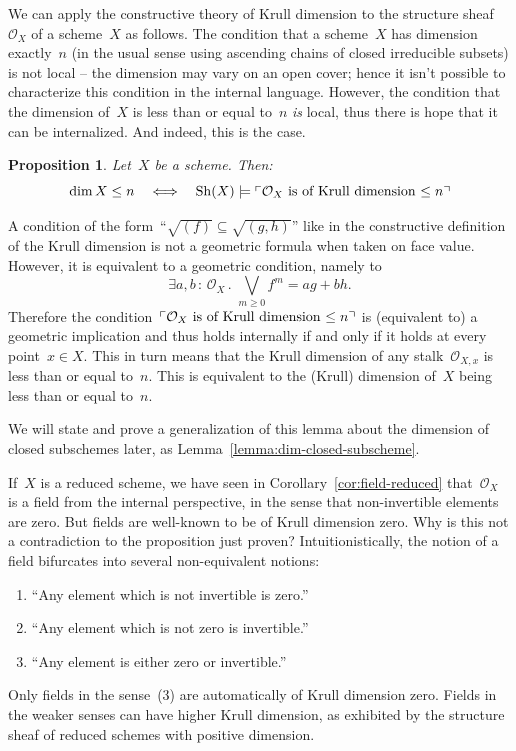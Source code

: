 \documentclass[10pt,reqno,a4paper]{amsbook}
\makeatletter
\theoremstyle{definition}
\theoremstyle{plain}
\newtheorem{prop}[defn]{Proposition}
\theoremstyle{remark}
\renewcommand{\O}{\mathcal{O}}
\newcommand{\Sh}{\mathrm{Sh}}
\newcommand{\?}{\,{:}\,}
\renewcommand{\_}{\mathpunct{.}\,}
\newcommand{\speak}[1]{\ulcorner\text{\textnormal{#1}}\urcorner}
\newcommand{\defeq}{\vcentcolon=}
\renewenvironment{proof}[1][\proofname]{\par
  \pushQED{\qed}%
  \normalfont \topsep6\p@\@plus6\p@\relax
  \trivlist
  \item[\hskip\labelsep
        \itshape
    #1\@addpunct{.}]\ignorespaces
}{%
  \popQED\endtrivlist\@endpefalse
}
\makeatother
\begin{document}
We can apply the constructive theory of Krull dimension to the structure
sheaf~$\O_X$ of a scheme~$X$ as follows. The condition that a
scheme~$X$ has dimension exactly~$n$ (in the usual sense using ascending chains
of closed irreducible subsets) is not local -- the dimension may vary on
an open cover; hence it isn't possible to characterize this condition in
the internal language. However, the condition that the dimension of~$X$ is less
than or equal to~$n$ \emph{is} local, thus there is hope that it can be
internalized. And indeed, this is the case.

\begin{prop}\label{prop:dimension-scheme-ox}
Let~$X$ be a scheme. Then:
\[ \dim X \leq n \quad\Longleftrightarrow\quad
  \Sh(X) \models \speak{$\O_X$ is of Krull dimension~$\leq n$}
  \]
\end{prop}
\begin{proof}

A condition of the form~``$\sqrt{(f)} \subseteq \sqrt{(g,h)}$''
like in the constructive definition of the Krull dimension is not a geometric
formula when taken on face value. However, it is equivalent to a geometric
condition, namely to
\[ \exists a,b\?\O_X\_ \bigvee_{m \geq 0} f^m = ag + bh. \]
Therefore the condition~$\speak{$\O_X$ is of Krull
dimension~$\leq n$}$ is (equivalent to) a geometric implication and thus holds
internally if and only if it holds at every point~$x \in X$. This in turn means that the
Krull dimension of any stalk~$\O_{X,x}$ is less than or equal to~$n$. This is
equivalent to the (Krull) dimension of~$X$ being less than or equal to~$n$.
\end{proof}

We will state and prove a generalization of this lemma about the dimension of closed
subschemes later, as Lemma~\ref{lemma:dim-closed-subscheme}.

If~$X$ is a reduced scheme, we have seen in Corollary~\ref{cor:field-reduced}
that~$\O_X$ is a field from the internal perspective, in the sense that
non-invertible elements are zero. But fields are well-known to be of Krull
dimension zero. Why is this not a contradiction to the proposition just proven?
Intuitionistically, the notion of a field bifurcates into several
non-equivalent notions:
\begin{enumerate}
\item ``Any element which is not invertible is zero.''
\item ``Any element which is not zero is invertible.''
\item ``Any element is either zero or invertible.''
\end{enumerate}
Only fields in the sense~(3) are automatically of Krull dimension zero.
Fields in the weaker senses can have higher Krull dimension, as exhibited by
the structure sheaf of reduced schemes with positive dimension.
\end{document}
